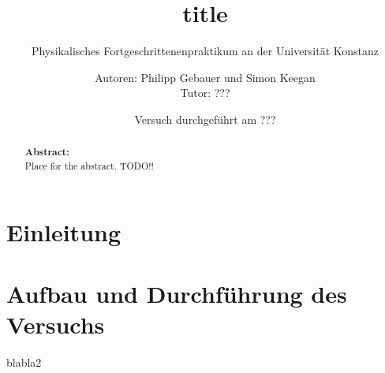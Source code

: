 

 
 \title{title}
 \subtitle{Physikalisches Fortgeschrittenenpraktikum an der Universität Konstanz}
 \author{Autoren: Philipp Gebauer und Simon Keegan \\ \large{Tutor: ???}}
 \date{Versuch durchgeführt am ???}
 \maketitle
 \vspace{2.5 cm}
 \begin{abstract}
     \noindent \textbf{Abstract:}\\
     Place for the abstract. TODO!!
     \vspace{1cm}
     
 \end{abstract}
 \thispagestyle{empty}
 \newpage
 
 \tableofcontents
 \thispagestyle{empty}
 \newpage
 \setcounter{page}{1}    
 
\section{Einleitung}
\section{Aufbau und Durchführung des Versuchs}
 
     
     \newpage
     
 
 \listoffigures
 
 blabla2
 
 